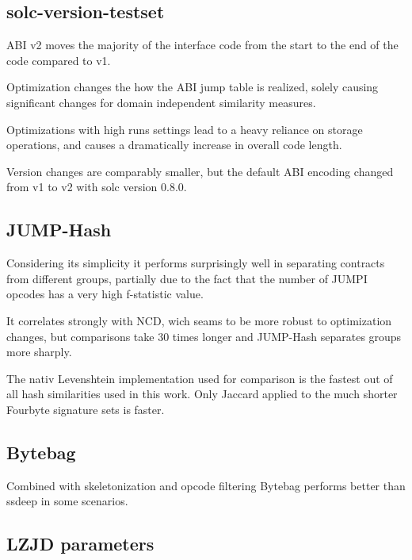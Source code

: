 \documentclass[../main.tex]{subfiles}
\begin{document}

\subsection{solc-version-testset}
ABI v2 moves the majority of the interface code from the start to the end of the code compared to v1.

Optimization changes the how the ABI jump table is realized, solely causing significant changes for domain independent similarity measures.

Optimizations with high runs settings lead to a heavy reliance on storage operations, and causes a dramatically increase in overall code length.

Version changes are comparably smaller, but the default ABI encoding changed from v1 to v2 with solc version 0.8.0.


\subsection{JUMP-Hash}
Considering its simplicity it performs surprisingly well in separating contracts from different groups, partially due to the fact that the number of JUMPI opcodes has a very high f-statistic value.

It correlates strongly with NCD, wich seams to be more robust to optimization changes, but comparisons take 30 times longer and JUMP-Hash separates groups more sharply.


The nativ Levenshtein implementation used for comparison is the fastest out of all hash similarities used in this work. Only Jaccard applied to the much shorter Fourbyte signature sets is faster.


\subsection{Bytebag}
Combined with skeletonization and opcode filtering Bytebag performs better than ssdeep in some scenarios.

\subsection{LZJD parameters}

\end{document}
